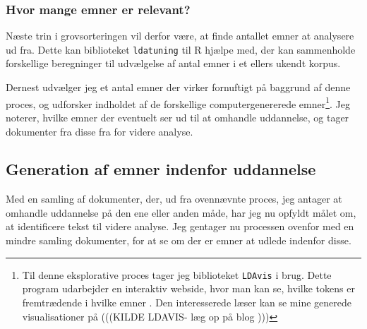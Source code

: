 \subsubsection{Hvor mange emner er relevant?}
Næste trin i grovsorteringen vil derfor være, at finde antallet emner at analysere ud fra. 
Dette kan biblioteket \texttt{ldatuning} til R hjælpe med, der kan sammenholde forskellige beregninger til udvælgelse af antal emner i et ellers ukendt korpus\autocite{nikitaSelectNumberTopics2016}.

Dernest udvælger jeg et antal emner der virker fornuftigt på baggrund af denne proces, og udforsker indholdet af de forskellige computergenererede emner\footnote{Til denne eksplorative proces tager jeg biblioteket \texttt{LDAvis} i brug. Dette program udarbejder en interaktiv webside, hvor man kan se, hvilke tokens er fremtrædende i hvilke emner \autocite{sievertCpsievertLDAvis2020}. Den interesserede læser kan se mine generede visualisationer på (((KILDE LDAVIS- læg op på blog )))}.
Jeg noterer, hvilke emner der eventuelt ser ud til at omhandle uddannelse, og tager dokumenter fra disse fra for videre analyse.

\subsection{Generation af emner indenfor uddannelse}
Med en samling af dokumenter, der, ud fra ovennævnte proces, jeg antager at omhandle uddannelse på den ene eller anden måde, har jeg nu opfyldt målet om, at identificere tekst til videre analyse.
Jeg gentager nu processen ovenfor med en mindre samling dokumenter, for at se om der er emner at udlede indenfor disse.


